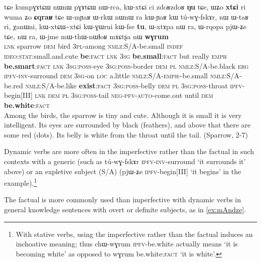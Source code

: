 \documentclass[oldfontcommands,oneside,a4paper,11pt]{article}
\newcommand{\ipa}[1]{{\phon \mbox{#1}}} %
\newcommand{\factual}[1]{\textsc{:fact}}
\begin{document}
\begin{exe}
\ex \label{ex:kumpGAtCW}
\gll
\ipa{tɕe} 	\ipa{kumpɣɤtɕɯ} 	\ipa{nɯnɯ} 	\ipa{pɣɤtɕɯ} 	\ipa{nɯ-rca,} 
 \ipa{kɯ-xtɕi} 	\ipa{ci} 	\ipa{zdoʁzdoʁ} 	\ipa{\textbf{ŋu}} 	\ipa{tɕe,}  \ipa{ɯʑo} 	\ipa{\textbf{xtɕi}} 	\ipa{ri} 	\ipa{wuma} 	\ipa{ʑo} 	\ipa{\textbf{ɕqraʁ}} \ipa{tɕe}  	\ipa{ɯ-mɲaʁ} 	\ipa{ɯ-rkɯ} 	\ipa{nɯnɯ} 	\ipa{ra} \ipa{kɯ-ɲaʁ} 	\ipa{kɯ} 	\ipa{tú-wɣ-fskɤr,} 	 	\ipa{nɯ} 	\ipa{ɯ-taʁ} 	\ipa{ri,} 	\ipa{χanɯni,} 	\ipa{kɯ-xtɕɯ\textasciitilde{}xtɕi} 	\ipa{kɯ-ɣɯrni} 	\ipa{kɯ-fse} 	\ipa{\textbf{tu},}  	\ipa{ɯ-xtɤpa} 	\ipa{nɯ} \ipa{ra,} 	\ipa{ɯ-rqopa} 	\ipa{pjɯ-ʑe} 	\ipa{tɕe,} 	\ipa{nɯ} \ipa{ra,}  \ipa{ɯ-jme} 	\ipa{mɯ-thɯ-nɯɬoʁ} 	\ipa{mɤɕtʂa} 	\ipa{nɯ} 	\ipa{\textbf{wɣrum}} \\
\textsc{lnk} sparrow \textsc{dem} bird \textsc{3pl}-among \textsc{nmlz}:S/A-be.small \textsc{indef} \textsc{ideo:stat}:small.and.cute \textbf{be}\factual{} \textsc{lnk}  \textsc{3sg} \textbf{be.small}\factual{} but really \textsc{emph} \textbf{be.smart}\factual{}  \textsc{lnk}  \textsc{3sg:poss}-eye \textsc{3sg:poss}-border \textsc{dem}  \textsc{pl}  \textsc{nmlz}:S/A-be.black \textsc{erg} \textsc{ipfv-inv}-surround \textsc{dem} \textsc{3sg}-on \textsc{loc} a.little \textsc{nmlz}:S/A-\textsc{emph}\textasciitilde{}be.small \textsc{nmlz}:S/A-be.red \textsc{nmlz}:S/A-be.like \textbf{exist}\factual{} \textsc{3sg:poss}-belly \textsc{dem}  \textsc{pl}  \textsc{3sg:poss}-throat \textsc{ipfv}-begin[III] \textsc{lnk}   \textsc{dem}  \textsc{pl}  \textsc{3sg:poss}-tail \textsc{neg-pfv-auto}-come.out until \textsc{dem} \textbf{be.white}\factual{} \\
\glt Among the birds, the sparrow is tiny and cute. Although it is small it is very intelligent. Its eyes are surrounded by black (feathers), and above that there are some red (dots). Its belly is white from the throat until the tail. (Sparrow, 2-7)
\end{exe}

 Dynamic verbs are more often in the imperfective rather than the factual in such contexts with a generic (such as \ipa{tú-wɣ-fskɤr}  \textsc{ipfv-inv}-surround  `it surrounds it' above)  or an expletive subject (S/A) (\ipa{pjɯ-ʑe} \textsc{ipfv}-begin[III] `it begins' in the example).\footnote{With stative verbs, using the imperfective rather than the factual induces an inchoative meaning; thus \ipa{chɯ-wɣrum} \textsc{ipfv}-be.white actually means `it is becoming white' as opposed to \ipa{wɣrum} be.white\factual{} `it is white'.}
 
 The factual is more commonly used than imperfective with dynamic verbs in general knowledge sentences with overt or definite subjects, as in \ref{ex:mAndze}.  
\end{document}
